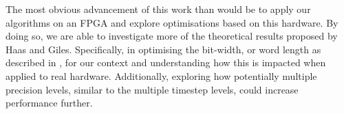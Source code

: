 The most obvious advancement of this work than would be to apply our algorithms on an FPGA and explore optimisations based on this hardware. By doing so, we are able to investigate more of the theoretical results proposed by Haas and Giles. Specifically, in optimising the bit-width, or word length as described in \cite{haasNestedMLMCFramework2025a}, for our context and understanding how this is impacted when applied to real hardware. Additionally, exploring how potentially multiple precision levels, similar to the multiple timestep levels, could increase performance further. 